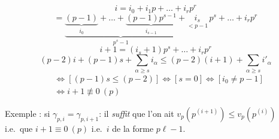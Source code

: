 \documentclass[11pt,a4paper]{article}
\begin{document}
\[ i = i_0 + i_1p + \dots + i_rp^r \]
  
\[ = \underbrace{\underbrace{(p-1)}_{i_0} + \dots + \underbrace{(p-1)p^{s-1}}_{i_{s-1}}}_{p^s - 1} + \underset{< p-1}{i_s}\,p^s + \dots + i_rp^r \]
\[ i + 1 = (i_s+1)p^s + \dots + i_rp^r \]
\[ (p-2)i + (p-1)s + \sum_{\alpha \geq s} i_\alpha \leq (p-2)(i+1) + \sum_{\alpha \geq s} i'_\alpha \]
\begin{align*}
[v_p(p^{(i)}) \leq v_p(p^{(i+1)})] &\Leftrightarrow [(p-1)s \leq (p-2)] \Leftrightarrow [s = 0] \Leftrightarrow [i_0 \neq p-1] \\
&\Leftrightarrow i + 1 \not\equiv 0 \ (p)
\end{align*}

Exemple : si $\gamma_{p,i} = \gamma_{p,i+1}$: il \emph{suffit} que l'on
ait \struck{\ill{}} $v_p(p^{(i+1)}) \leq v_p(p^{(i)})$
i.e.\ que \struck{\ill{}} $i + 1 \equiv 0 \ (p)$
i.e.\ $i$ de la forme $p\ell - 1$.
\end{document}
